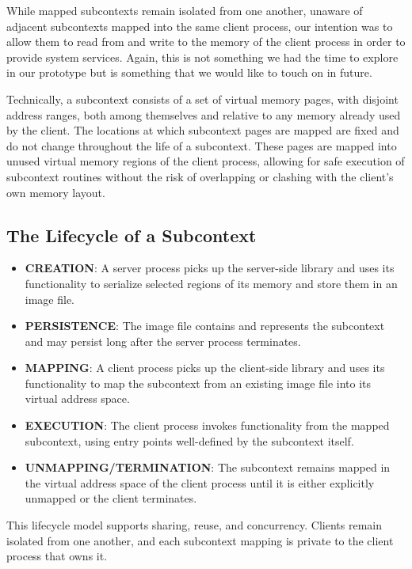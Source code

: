 While mapped subcontexts remain isolated from one another, unaware of adjacent subcontexts mapped into the same client process, our intention was to allow them to read from and write to the memory of the client process in order to provide system services. Again, this is not something we had the time to explore in our prototype but is something that we would like to touch on in future.

Technically, a subcontext consists of a set of virtual memory pages, with disjoint address ranges, both among themselves and relative to any memory already used by the client. The locations at which subcontext pages are mapped are fixed and do not change throughout the life of a subcontext. These pages are mapped into unused virtual memory regions of the client process, allowing for safe execution of subcontext routines without the risk of overlapping or clashing with the client’s own memory layout.

\subsection*{The Lifecycle of a Subcontext}
\begin{itemize}
    \item \textbf{CREATION}: A server process picks up the server-side library and uses its functionality to serialize selected regions of its memory and store them in an image file.
    \item \textbf{PERSISTENCE}: The image file contains and represents the subcontext and may persist long after the server process terminates.
    \item \textbf{MAPPING}: A client process picks up the client-side library and uses its functionality to map the subcontext from an existing image file into its virtual address space.
    \item \textbf{EXECUTION}: The client process invokes functionality from the mapped subcontext, using entry points well-defined by the subcontext itself.
    \item \textbf{UNMAPPING/TERMINATION}: The subcontext remains mapped in the virtual address space of the client process until it is either explicitly unmapped or the client terminates.
\end{itemize}

This lifecycle model supports sharing, reuse, and concurrency. Clients remain isolated from one another, and each subcontext mapping is private to the client process that owns it.


